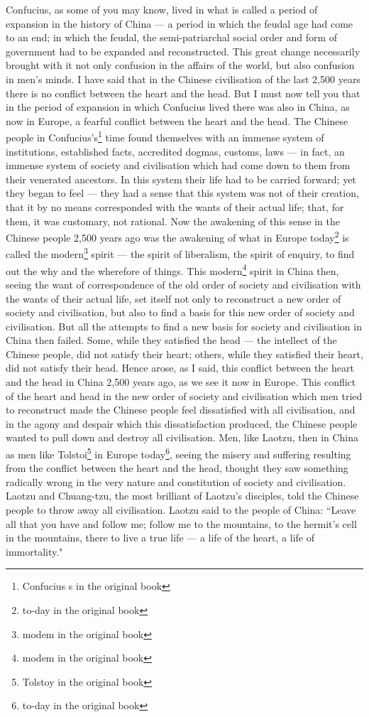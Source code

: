 Confucius, as some of you may know, lived in what is called a period of expansion in the history of China --- a period in which the feudal age had come to an end; in which the feudal, the semi-patriarchal social order and form of government had to be expanded and reconstructed.
This great change necessarily brought with it not only confusion in the affairs of the world, but also confusion in men's minds.
I have said that in the Chinese civilisation of the last 2,500 years there is no conflict between the heart and the head.
But I must now tell you that in the period of expansion in which Confucius lived there was also in China, as now in Europe, a fearful conflict between the heart and the head. The Chinese people in Confucius's\footnote{Confucius s in the original book} time found themselves with an immense system of institutions, established facts, accredited dogmas, customs, laws --- in fact, an immense system of society and civilisation which had come down to them from their venerated ancestors. In this system their life had to be carried forward; yet they began to feel --- they had a sense that this system was not of their creation, that it by no means corresponded with the wants of their actual life; that, for them, it was customary, not rational.
Now the awakening of this sense in the Chinese people 2,500 years ago was the awakening of what in Europe today\footnote{to-day in the original book} is called the modern\footnote{modem in the original book} spirit --- the spirit of liberalism, the spirit of enquiry, to find out the why and the wherefore of things.
This modern\footnote{modem in the original book} spirit in China then, seeing the want of correspondence of the old order of society and civilisation with the wants of their actual life, set itself not only to reconstruct a new order of society and civilisation, but also to find a basis for this new order of society and civilisation.
But all the attempts to find a new basis for society and civilisation in China then failed. Some, while they satisfied the head --- the intellect of the Chinese people, did not satisfy their heart; others, while they satisfied their heart, did not satisfy their head. Hence arose, as I said, this conflict between the heart and the head in China 2,500 years ago, as we see it now in Europe.
This conflict of the heart and head in the new order of society and civilisation which men tried to reconstruct made the Chinese people feel dissatisfied with all civilisation, and in the agony and despair which this dissatisfaction produced, the Chinese people wanted to pull down and destroy all civilisation.
Men, like Laotzu, then in China as men like Tolstoi\footnote{Tolstoy in the original book} in Europe today\footnote{to-day in the original book}, seeing the misery and suffering resulting from the conflict between the heart and the head, thought they saw something radically wrong in the very nature and constitution of society and civilisation.
Laotzu and Chuang-tzu, the most brilliant of Laotzu's disciples, told the Chinese people to throw away all civilisation.
Laotzu said to the people of China: ``Leave all that you have and follow me; follow me to the mountains, to the hermit's cell in the mountains, there to live a true life --- a life of the heart, a life of immortality."

